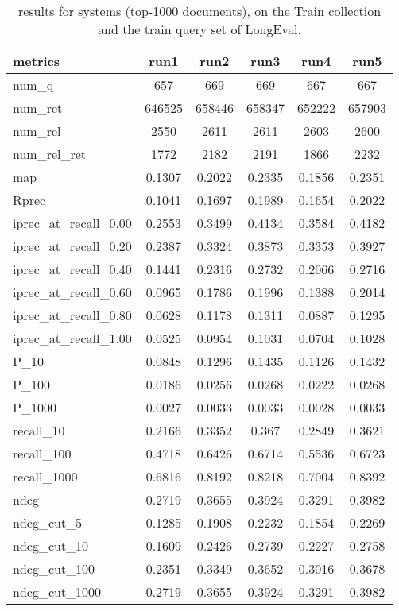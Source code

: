 \begin{table}[h!]
    \centering
    \caption{results for systems (top-1000 documents), on the Train collection and the train query set of LongEval.}
    \begin{tabular}{ |l|c|c|c|c|c| }
        \hline
        metrics & run1 & run2 & run3 & run4 & run5 \\ \hline
        num\_q & 657 & 669 & 669 & 667 & 667 \\ \hline
        num\_ret & 646525 & 658446 & 658347 & 652222 & 657903 \\ \hline
        num\_rel & 2550 & 2611 & 2611 & 2603 & 2600 \\ \hline
        num\_rel\_ret & 1772 & 2182 & 2191 & 1866 & 2232 \\ \hline
        map & 0.1307 & 0.2022 & 0.2335 & 0.1856 & 0.2351 \\ \hline
        Rprec & 0.1041 & 0.1697 & 0.1989 & 0.1654 & 0.2022 \\ \hline
        iprec\_at\_recall\_0.00 & 0.2553 & 0.3499 & 0.4134 & 0.3584 & 0.4182 \\ \hline
        iprec\_at\_recall\_0.20 & 0.2387 & 0.3324 & 0.3873 & 0.3353 & 0.3927 \\ \hline
        iprec\_at\_recall\_0.40 & 0.1441 & 0.2316 & 0.2732 & 0.2066 & 0.2716 \\ \hline
        iprec\_at\_recall\_0.60 & 0.0965 & 0.1786 & 0.1996 & 0.1388 & 0.2014 \\ \hline
        iprec\_at\_recall\_0.80 & 0.0628 & 0.1178 & 0.1311 & 0.0887 & 0.1295 \\ \hline
        iprec\_at\_recall\_1.00 & 0.0525 & 0.0954 & 0.1031 & 0.0704 & 0.1028 \\ \hline
        P\_10 & 0.0848 & 0.1296 & 0.1435 & 0.1126 & 0.1432 \\ \hline
        P\_100 & 0.0186 & 0.0256 & 0.0268 & 0.0222 & 0.0268 \\ \hline
        P\_1000 & 0.0027 & 0.0033 & 0.0033 & 0.0028 & 0.0033 \\ \hline
        recall\_10 & 0.2166 & 0.3352 & 0.367 & 0.2849 & 0.3621 \\ \hline
        recall\_100 & 0.4718 & 0.6426 & 0.6714 & 0.5536 & 0.6723 \\ \hline
        recall\_1000 & 0.6816 & 0.8192 & 0.8218 & 0.7004 & 0.8392 \\ \hline
        ndcg & 0.2719 & 0.3655 & 0.3924 & 0.3291 & 0.3982 \\ \hline
        ndcg\_cut\_5 & 0.1285 & 0.1908 & 0.2232 & 0.1854 & 0.2269 \\ \hline
        ndcg\_cut\_10 & 0.1609 & 0.2426 & 0.2739 & 0.2227 & 0.2758 \\ \hline
        ndcg\_cut\_100 & 0.2351 & 0.3349 & 0.3652 & 0.3016 & 0.3678 \\ \hline
        ndcg\_cut\_1000 & 0.2719 & 0.3655 & 0.3924 & 0.3291 & 0.3982 \\ \hline
    \end{tabular}
    \label{table:results}
\end{table}

